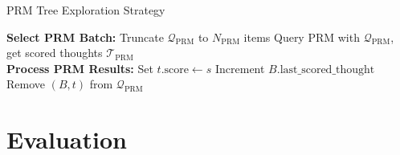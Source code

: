 \documentclass[12pt,twoside]{report}
\begin{document}
\begin{algorithm}[H]\label{alg:prmtreesearch}
\caption{PRM Tree Exploration Strategy}
\begin{algorithmic}[1]
    \Statex \textbf{Select PRM Batch:}
    \State Truncate $\mathcal{Q}_{\text{PRM}}$ to $N_{\text{PRM}}$ items
    \State Query PRM with $\mathcal{Q}_{\text{PRM}}$, get scored thoughts $\mathcal{T}_{\text{PRM}}$ \\
    \Statex \textbf{Process PRM Results:}
        \State Set $t.\text{score} \gets s$
        \State Increment $B.\text{last\_scored\_thought}$
        \State Remove $(B, t)$ from $\mathcal{Q}_{\text{PRM}}$
    \EndFor
\end{algorithmic}
\end{algorithm}

\chapter{Evaluation}

\end{document}

